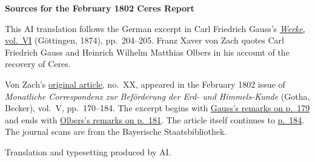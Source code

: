 \clearpage\thispagestyle{empty}
\begin{center}\textbf{Sources for the February 1802 Ceres Report}\end{center}
\noindent This AI translation follows the German excerpt in Carl Friedrich Gauss’s \href{https://gdz.sub.uni-goettingen.de/id/PPN236007467}{\textit{Werke}, vol.~VI} (Göttingen, 1874), pp.~204--205. Franz Xaver von Zach quotes Carl Friedrich Gauss and Heinrich Wilhelm Matthias Olbers in his account of the recovery of Ceres.
\par\smallskip\noindent Von Zach’s \href{https://api.digitale-sammlungen.de/iiif/image/v2/bsb10538597_00178/full/1450,/0/default.jpg}{original article}, no.~XX, appeared in the February 1802 issue of \textit{Monatliche Correspondenz zur Beförderung der Erd- und Himmels-Kunde} (Gotha, Becker), vol.~V, pp.~170--184. The excerpt begins with \href{https://api.digitale-sammlungen.de/iiif/image/v2/bsb10538597_00187/full/1450,/0/default.jpg}{Gauss’s remarks on p.~179} and ends with \href{https://api.digitale-sammlungen.de/iiif/image/v2/bsb10538597_00189/full/1450,/0/default.jpg}{Olbers’s remarks on p.~181}. The article itself continues to \href{https://api.digitale-sammlungen.de/iiif/image/v2/bsb10538597_00192/full/1450,/0/default.jpg}{p.~184}. The journal scans are from the Bayerische Staatsbibliothek.
\par\smallskip\noindent Translation and typesetting produced by AI.
\clearpage
